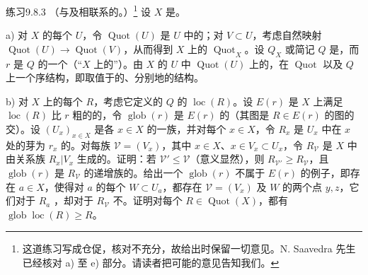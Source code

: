 \begin{SGAresult}{练习}{9.8.3}
（与及相联系的。）\footnote{这道练习写成仓促，核对不充分，故给出时保留一切意见。N. Saavedra 先生已经核对 a) 至 e) 部分。请读者把可能的意见告知我们。}
设 $X$ 是。

a) 对 $X$ 的每个 $U$，令 $\operatorname{Quot}(U)$ 是 $U$ 中的；对 $V\subset U$，考虑自然映射 $\operatorname{Quot}(U)\to\operatorname{Quot}(V)$，从而得到 $X$ 上的 $\operatorname{Quot}_X$。设 $Q_X$ 或简记 $Q$ 是，而 $r$ 是 $Q$ 的一个（“$X$ 上的”）。由 $X$ 的 $U$ 中 $\operatorname{Quot}(U)$ 上的，在 $\operatorname{Quot}$ 以及 $Q$ 上一个序结构，即取值于的、分别地的结构。

b) 对 $X$ 上的每个 $R$，考虑它定义的 $Q$ 的 $\operatorname{loc}(R)$。设 $E(r)$ 是 $X$ 上满足 $\operatorname{loc}(R)$
比 $r$ 粗的的，令 $\operatorname{glob}(r)$ 是 $E(r)$ 的（其图是 $R\in E(r)$ 的图的交）。设 $(U_x)_{x\in X}$ 是各 $x\in X$ 的一族，并对每个 $x\in X$，令 $R_x$ 是 $U_x$ 中在 $x$ 处的芽为 $r_x$ 的。对每族 $\mathscr V=(V_x)$，其中 $x\in X$、$x\in V_x\subset U_x$，令 $R_{\mathscr V}$ 是 $X$ 中由关系族 $R_x|V_x$ 生成的。证明：若 $\mathscr V'\leq\mathscr V$（意义显然），则 $R_{\mathscr V'}\geq R_{\mathscr V}$，且 $\operatorname{glob}(r)$ 是 $R_{\mathscr V}$ 的递增族的。给出一个 $\operatorname{glob}(r)$ 不属于 $E(r)$ 的例子，即存在 $a\in X$，使得对 $a$ 的每个 $W\subset U_a$，都存在 $\mathscr V=(V_x)$ 及 $W$ 的两个点 $y,z$，它们对于 $R_a$ ，却对于 $R_{\mathscr V}$ 不。证明对每个 $R\in\operatorname{Quot}(X)$，都有 $\operatorname{glob}\operatorname{loc}(R)\geq R$。


\end{SGAresult}
